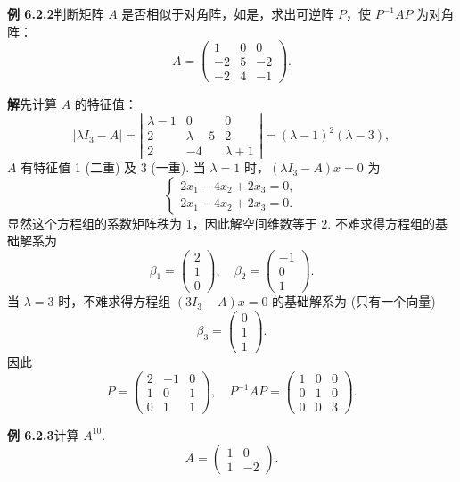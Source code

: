 \documentclass[UTF8,12pt,a4paper,fontset=fandol]{ctexart}
\begin{document}
\noindent\textbf{例 6.2.2}\quad 判断矩阵 $A$ 是否相似于对角阵，如是，求出可逆阵 $P$，使 $P^{-1}AP$ 为对角阵：
\[
A=\left(\begin{array}{ccc}
1 & 0 & 0\\
-2 & 5 & -2\\
-2 & 4 & -1
\end{array}\right).
\]

\noindent\textbf{解}\quad 先计算 $A$ 的特征值：
\[
|\lambda I_3-A|=
\left|\begin{array}{ccc}
\lambda-1 & 0 & 0\\
2 & \lambda-5 & 2\\
2 & -4 & \lambda+1
\end{array}\right|
=(\lambda-1)^2(\lambda-3),
\]
$A$ 有特征值 1 (二重) 及 3 (一重). 当 $\lambda=1$ 时，$(\lambda I_3-A)x=0$ 为
\[
\left\{\begin{array}{l}
2x_1-4x_2+2x_3=0,\\
2x_1-4x_2+2x_3=0.
\end{array}\right.
\]
显然这个方程组的系数矩阵秩为 1，因此解空间维数等于 2. 不难求得方程组的基础解系为
\[
\beta_1=\left(\begin{array}{c}
2\\
1\\
0
\end{array}\right),\quad
\beta_2=\left(\begin{array}{c}
-1\\
0\\
1
\end{array}\right).
\]
当 $\lambda=3$ 时，不难求得方程组 $(3I_3-A)x=0$ 的基础解系为 (只有一个向量)
\[
\beta_3=\left(\begin{array}{c}
0\\
1\\
1
\end{array}\right).
\]
因此
\[
P=\left(\begin{array}{ccc}
2 & -1 & 0\\
1 & 0 & 1\\
0 & 1 & 1
\end{array}\right),\quad
P^{-1}AP=\left(\begin{array}{ccc}
1 & 0 & 0\\
0 & 1 & 0\\
0 & 0 & 3
\end{array}\right).
\]

\noindent\textbf{例 6.2.3}\quad 计算 $A^{10}$.
\[
A=\left(\begin{array}{cc}
1 & 0\\
1 & -2
\end{array}\right).
\]
\end{document}
